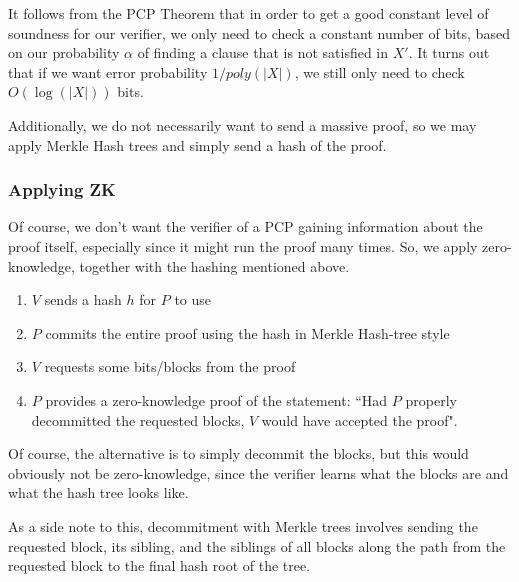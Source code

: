 \documentclass[11pt]{article}
\begin{document}
It follows from the PCP Theorem that in order to get a good constant level of soundness for our verifier, we only need to check a constant number of bits, based on our probability \(\alpha\) of finding a clause that is not satisfied in \(X'\). It turns out that if we want error probability \(1/poly(|X|)\), we still only need to check \(O(\log(|X|))\) bits.\medskip

Additionally, we do not necessarily want to send a massive proof, so we may apply Merkle Hash trees and simply send a hash of the proof.

\subsubsection{Applying ZK}
Of course, we don't want the verifier of a PCP gaining information about the proof itself, especially since it might run the proof many times. So, we apply zero-knowledge, together with the hashing mentioned above.

\begin{enumerate}
\item \(V\) sends a hash \(h\) for \(P\) to use
\item \(P\) commits the entire proof using the hash in Merkle Hash-tree style
\item \(V\) requests some bits/blocks from the proof
\item \(P\) provides a zero-knowledge proof of the statement: ``Had \(P\) properly decommitted the requested blocks, \(V\) would have accepted the proof".
\end{enumerate}

Of course, the alternative is to simply decommit the blocks, but this would obviously not be zero-knowledge, since the verifier learns what the blocks are and what the hash tree looks like. \bigskip

As a side note to this, decommitment with Merkle trees involves sending the requested block, its sibling, and the siblings of all blocks along the path from the requested block to the final hash root of the tree.
\end{document}
